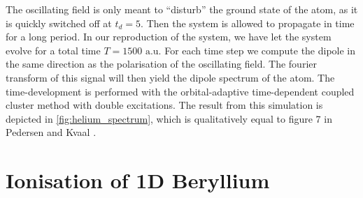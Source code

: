 The oscillating field is only meant to ``disturb'' the ground state of the atom,
as it is quickly 
switched off at $t_d=5$. Then the system is allowed to propagate in time for 
a long period. In our reproduction of the system, we have let the system 
evolve for a total time $T=1500 \text{ a.u.}$ For each time step we compute the 
dipole in the same direction as the polarisation of the oscillating field. The 
fourier transform of this signal will then yield the dipole spectrum of the 
atom. The time-development is performed with the orbital-adaptive time-dependent 
coupled cluster method with double excitations. The result from this simulation is 
depicted in \autoref{fig:helium_spectrum}, which is qualitatively equal to figure 
7 in Pedersen and Kvaal \cite{pedersen2019symplectic}.

\section{Ionisation of 1D Beryllium}
\label{sec:miyagi_replication}

